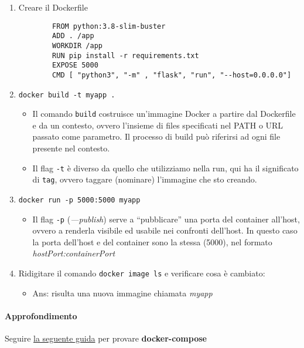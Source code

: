 \begin{enumerate}
    \begin{enumerate}
        \item Creare il Dockerfile
        \begin{lstlisting}
        FROM python:3.8-slim-buster
        ADD . /app
        WORKDIR /app
        RUN pip install -r requirements.txt
        EXPOSE 5000
        CMD [ "python3", "-m" , "flask", "run", "--host=0.0.0.0"]    
        \end{lstlisting}
        
        \item \verb|docker build -t myapp .|
        \begin{itemize}
            \item Il comando \verb|build| costruisce un’immagine Docker a partire dal Dockerfile e da un contesto, ovvero l’insieme di files specificati nel PATH o URL passato come parametro. Il processo di build può riferirsi ad ogni file presente nel contesto.
            \item Il flag \verb|-t| è diverso da quello che utilizziamo nella run, qui ha il significato di \verb|tag|, ovvero taggare (nominare) l’immagine che sto creando.
        \end{itemize}

        \item \verb|docker run -p 5000:5000 myapp|

        \begin{itemize}
            \item Il flag \verb|-p| (\textit{—publish}) serve a “pubblicare” una porta del container all’host, ovvero a renderla visibile ed usabile nei confronti dell’host. In questo caso la porta dell’host e del container sono la stessa (5000), nel formato \textit{hostPort:containerPort}
        \end{itemize}

        \item Ridigitare il comando \verb|docker image ls| e verificare cosa è cambiato:
        \begin{itemize}
            \item Ans: risulta una nuova immagine chiamata \textit{myapp}
        \end{itemize}
        
    \end{enumerate}
    
\end{enumerate}

\paragraph{Approfondimento} Seguire \href{https://docs.docker.com/compose/gettingstarted/}{la seguente guida} per provare \textbf{docker-compose}